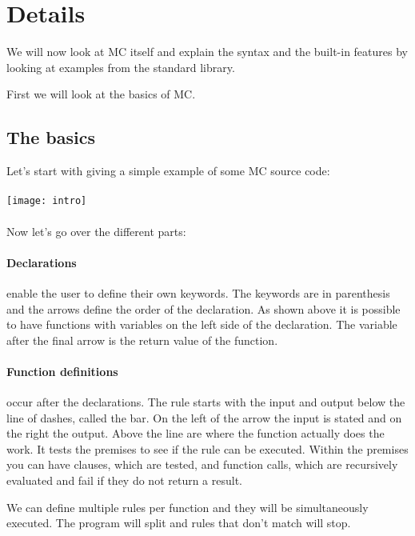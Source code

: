 \section{Details}
We will now look at MC itself and explain the syntax and the built-in features by looking at examples from the standard library.

First we will look at the basics of MC.

\subsection{The basics}
Let's start with giving a simple example of some MC source code:

\paragraph{}
\texttt{[image: intro]}

\paragraph{}
Now let's go over the different parts:

\paragraph{Declarations}
enable the user to define their own keywords.
The keywords are in parenthesis and the arrows define the order of the declaration.
As shown above it is possible to have functions with variables on the left side of the declaration.
The variable after the final arrow is the return value of the function.

\paragraph{Function definitions}
occur after the declarations.
The rule starts with the input and output below the line of dashes, called the bar.
On the left of the arrow the input is stated and on the right the output.
Above the line are where the function actually does the work.
It tests the premises to see if the rule can be executed.
Within the premises you can have clauses, which are tested, and function calls, which are recursively evaluated and fail if they do not return a result.

We can define multiple rules per function and they will be simultaneously executed.
The program will split and rules that don't match will stop.

